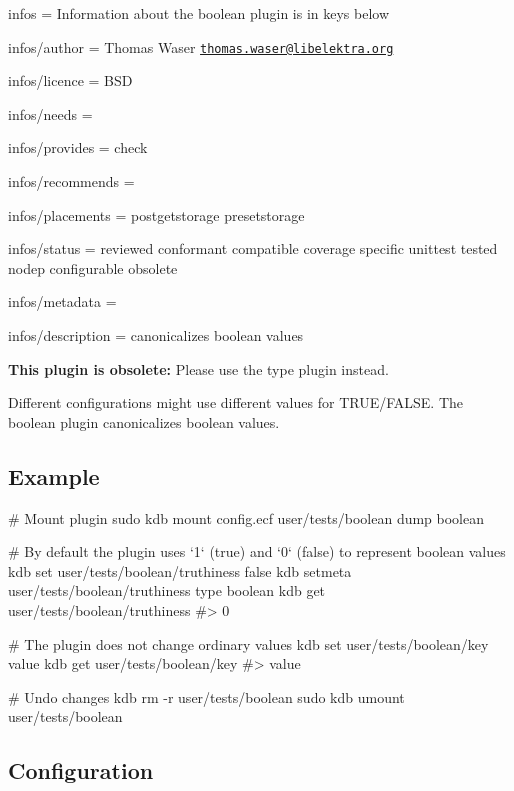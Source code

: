 
\begin{DoxyItemize}
\item infos = Information about the boolean plugin is in keys below
\item infos/author = Thomas Waser \href{mailto:thomas.waser@libelektra.org}{\tt thomas.\+waser@libelektra.\+org}
\item infos/licence = B\+SD
\item infos/needs =
\item infos/provides = check
\item infos/recommends =
\item infos/placements = postgetstorage presetstorage
\item infos/status = reviewed conformant compatible coverage specific unittest tested nodep configurable obsolete
\item infos/metadata =
\item infos/description = canonicalizes boolean values
\end{DoxyItemize}

{\bfseries This plugin is obsolete\+:} Please use the {\ttfamily type} plugin instead.

Different configurations might use different values for {\ttfamily T\+R\+UE}/{\ttfamily F\+A\+L\+SE}. The {\ttfamily boolean} plugin canonicalizes boolean values.

\subsection*{Example}


\begin{DoxyCode}
# Mount plugin
sudo kdb mount config.ecf user/tests/boolean dump boolean

# By default the plugin uses `1` (true) and `0` (false) to represent boolean values
kdb set user/tests/boolean/truthiness false
kdb setmeta user/tests/boolean/truthiness type boolean
kdb get user/tests/boolean/truthiness
#> 0

# The plugin does not change ordinary values
kdb set user/tests/boolean/key value
kdb get user/tests/boolean/key
#> value

# Undo changes
kdb rm -r user/tests/boolean
sudo kdb umount user/tests/boolean
\end{DoxyCode}


\subsection*{Configuration}


